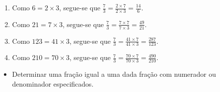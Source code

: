 \begin{multicols}{2}
\begin{orientacoes}{}{}


\end{orientacoes}

\begin{solucao}{}{}
\begin{enumerate} [\quad a)] %
    \item       Como       $6 = 2 \times 3$, segue-se que       $\frac{7}{3} =
\frac{2 \times 7}{2 \times 3} = \frac{14}{6}$.
    \item       Como       $21 = 7 \times 3$, segue-se que       $\frac{7}{3} =
\frac{7 \times 7}{7 \times 3} = \frac{49}{21}$.
    \item       Como       $123 = 41 \times 3$, segue-se que       $\frac{7}{3}
= \frac{41 \times 7}{41 \times 3} = \frac{287}{123}$.
    \item       Como       $210 = 70 \times 3$, segue-se que       $\frac{7}{3}
= \frac{70 \times 7}{70 \times 3} = \frac{490}{210}$.
\end{enumerate} %
\end{solucao}


\begin{objetivos}[label=chap4-ativ10]{}{}
\begin{itemize} %
    \item       Determinar uma fração igual a uma dada fração com numerador ou
denominador especificados.
\end{itemize} %
\end{objetivos}



\end{multicols}
